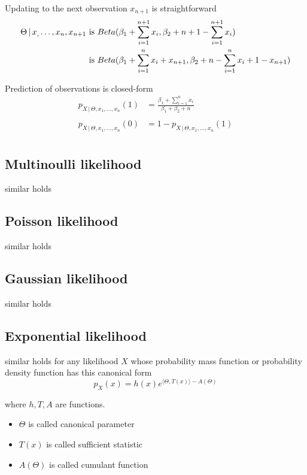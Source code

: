 \documentclass[14pt, reqno]{amsart}
\theoremstyle{definition}
\begin{document}
Updating to the next observation $x_{n+1}$ is straightforward
\vspace{10pt}
\begin{align*}
\Theta \,|\, x_, \dots, x_n, x_{n+1} & \text{ is } Beta(\beta_1 + \sum \limits _{i=1}^{n+1} x_i, \beta_2  + n + 1 - \sum \limits _{i=1}^{n + 1} x_i) \\
 & \textnormal{ is } Beta(\beta_1 + \sum \limits _{i=1}^n x_i + x_{n + 1}, \beta_2  + n - \sum \limits _{i=1}^n x_i + 1 - x_{n + 1}) \\
\end{align*}
\vfill
\pagebreak

Prediction of observations is closed-form
\vspace{10pt}
\begin{align*}
p_{X \,|\, \Theta, x_1, \dots, x_n} (1) & = \frac{\beta_1 + \sum \limits _{i=1}^n x_i}{\beta_1 + \beta_2 + n} \\
\\
p_{X \,|\, \Theta, x_1, \dots, x_n} (0) & = 1 - p_{X \,|\, \Theta, x_1, \dots, x_n} (1) \\
\end{align*}
\vfill
\pagebreak

\subsection{Multinoulli likelihood} similar holds
\vfill
\pagebreak

\subsection{Poisson likelihood} similar holds
\vfill
\pagebreak

\subsection{Gaussian likelihood} similar holds
\vfill
\pagebreak

\subsection{Exponential likelihood} similar holds for any likelihood $X$ whose probability mass function or probability density function has this canonical form
\vspace{10pt}
$$p_X(x) = h(x) e^{\langle \Theta, T(x) \rangle - A(\Theta)}$$
\vspace{10pt}

\noindent
where $h, T, A$ are functions.
\vspace{10pt}
\begin{itemize}
\item $\Theta$ is called canonical parameter
\item $T(x)$ is called sufficient statistic
\item $A(\Theta)$ is called cumulant function
\end{itemize}
\vfill
\pagebreak
\end{document}
